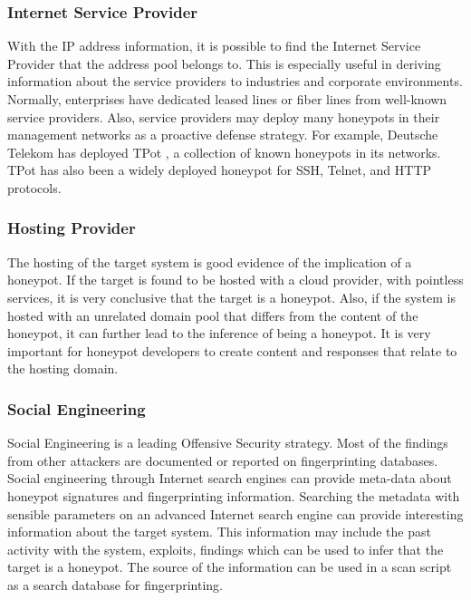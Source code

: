 \subsubsection{Internet Service Provider}
With the IP address information, it is possible to find the Internet Service Provider that the address pool belongs to. This is especially useful in deriving information about the service providers to industries and corporate environments. Normally, enterprises have dedicated leased lines or fiber lines from well-known service providers. Also, service providers may deploy many honeypots in their management networks as a proactive defense strategy. For example, Deutsche Telekom has deployed TPot \cite{TPot}, a collection of known honeypots in its networks. TPot has also been a widely deployed honeypot for SSH, Telnet, and HTTP protocols. 

\subsubsection{Hosting Provider}
The hosting of the target system is good evidence of the implication of a honeypot. If the target is found to be hosted with a cloud provider, with pointless services, it is very conclusive that the target is a honeypot. Also, if the system is hosted with an unrelated domain pool that differs from the content of the honeypot, it can further lead to the inference of being a honeypot. It is very important for honeypot developers to create content and responses that relate to the hosting domain. 

\subsubsection{Social Engineering}
Social Engineering is a leading Offensive Security strategy. Most of the findings from other attackers are documented or reported on fingerprinting databases. Social engineering through Internet search engines can provide meta-data about honeypot signatures and fingerprinting information. Searching the metadata with sensible parameters on an advanced Internet search engine can provide interesting information about the target system. This information may include the past activity with the system, exploits, findings which can be used to infer that the target is a honeypot. The source of the information can be used in a scan script as a search database for fingerprinting. 

